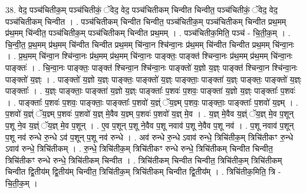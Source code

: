 \documentclass[17pt]{extarticle}
\begin{document}
38. वेद॒ पञ्च॑चितीक॒म् पञ्च॑चितीकं॒ ॅवेद॒ वेद॒ पञ्च॑चितीकम् चिन्वीत चिन्वीत॒ पञ्च॑चितीकं॒ ॅवेद॒ वेद॒ पञ्च॑चितीकम् चिन्वीत । . पञ्च॑चितीकम् चिन्वीत चिन्वीत॒ पञ्च॑चितीक॒म् पञ्च॑चितीकम् चिन्वीत प्रथ॒मम् प्र॑थ॒मम् चि॑न्वीत॒ पञ्च॑चितीक॒म् पञ्च॑चितीकम् चिन्वीत प्रथ॒मम् । . पञ्च॑चितीक॒मिति॒ पञ्च॑ - चि॒ती॒क॒म् । . चि॒न्वी॒त॒ प्र॒थ॒मम् प्र॑थ॒मम् चि॑न्वीत चिन्वीत प्रथ॒मम् चि॑न्वा॒न श्चि॑न्वा॒नः प्र॑थ॒मम् चि॑न्वीत चिन्वीत प्रथ॒मम् चि॑न्वा॒नः । . प्र॒थ॒मम् चि॑न्वा॒न श्चि॑न्वा॒नः प्र॑थ॒मम् प्र॑थ॒मम् चि॑न्वा॒नः पाङ्क्तः॒ पाङ्क्त॑ श्चिन्वा॒नः प्र॑थ॒मम् प्र॑थ॒मम् चि॑न्वा॒नः पाङ्क्तः॑ । . चि॒न्वा॒नः पाङ्क्तः॒ पाङ्क्त॑ श्चिन्वा॒न श्चि॑न्वा॒नः पाङ्क्तो॑ य॒ज्ञो य॒ज्ञ्ः पाङ्क्त॑ श्चिन्वा॒न श्चि॑न्वा॒नः पाङ्क्तो॑ य॒ज्ञ्ः । . पाङ्क्तो॑ य॒ज्ञो य॒ज्ञ्ः पाङ्क्तः॒ पाङ्क्तो॑ य॒ज्ञ्ः पाङ्क्ताः॒ पाङ्क्ता॑ य॒ज्ञ्ः पाङ्क्तः॒ पाङ्क्तो॑ य॒ज्ञ्ः पाङ्क्ताः᳚ । . य॒ज्ञ्ः पाङ्क्ताः॒ पाङ्क्ता॑ य॒ज्ञो य॒ज्ञ्ः पाङ्क्ताः᳚ प॒शवः॑ प॒शवः॒ पाङ्क्ता॑ य॒ज्ञो य॒ज्ञ्ः पाङ्क्ताः᳚ प॒शवः॑ । . पाङ्क्ताः᳚ प॒शवः॑ प॒शवः॒ पाङ्क्ताः॒ पाङ्क्ताः᳚ प॒शवो॑ य॒ज्ञ्ं ॅय॒ज्ञ्म् प॒शवः॒ पाङ्क्ताः॒ पाङ्क्ताः᳚ प॒शवो॑ य॒ज्ञ्म् । . प॒शवो॑ य॒ज्ञ्ं ॅय॒ज्ञ्म् प॒शवः॑ प॒शवो॑ य॒ज्ञ् मे॒वैव य॒ज्ञ्म् प॒शवः॑ प॒शवो॑ य॒ज्ञ् मे॒व । . य॒ज्ञ् मे॒वैव य॒ज्ञ्ं ॅय॒ज्ञ् मे॒व प॒शून् प॒शू ने॒व य॒ज्ञ्ं ॅय॒ज्ञ् मे॒व प॒शून् । . ए॒व प॒शून् प॒शू ने॒वैव प॒शू नवाव॑ प॒शू ने॒वैव प॒शू नव॑ । . प॒शू नवाव॑ प॒शून् प॒शू नव॑ रुन्धे रु॒न्धे ऽव॑ प॒शून् प॒शू नव॑ रुन्धे । . अव॑ रुन्धे रु॒न्धे ऽवाव॑ रुन्धे॒ त्रिचि॑तीक॒म् त्रिचि॑तीकꣳ रु॒न्धे ऽवाव॑ रुन्धे॒ त्रिचि॑तीकम् । . रु॒न्धे॒ त्रिचि॑तीक॒म् त्रिचि॑तीकꣳ रुन्धे रुन्धे॒ त्रिचि॑तीकम् चिन्वीत चिन्वीत॒ त्रिचि॑तीकꣳ रुन्धे रुन्धे॒ त्रिचि॑तीकम् चिन्वीत । . त्रिचि॑तीकम् चिन्वीत चिन्वीत॒ त्रिचि॑तीक॒म् त्रिचि॑तीकम् चिन्वीत द्वि॒तीय॑म् द्वि॒तीय॑म् चिन्वीत॒ त्रिचि॑तीक॒म् त्रिचि॑तीकम् चिन्वीत द्वि॒तीय᳚म् । . त्रिचि॑तीक॒मिति॒ त्रि - चि॒ती॒क॒म् । \newline
\end{document}
